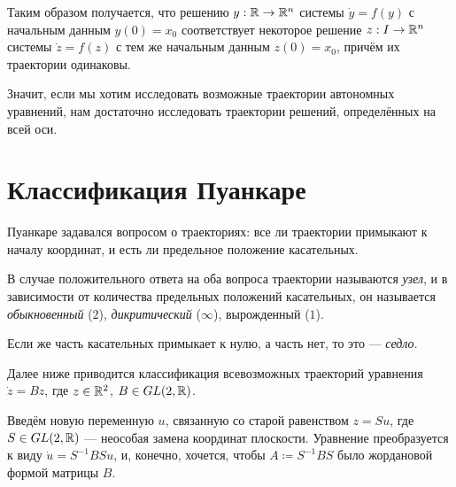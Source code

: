 \documentclass[a4paper]{report}
\begin{document}
    Таким образом получается, что решению $y: \mathbb{R} \rightarrow \mathbb{R}^n$ системы $\dot{y} = f(y)$ с начальным данным $y(0) = x_0$ соответствует некоторое решение $z: I \rightarrow \mathbb{R}^n$ системы $\dot{z} = f(z)$ с тем же начальным данным $z(0) = x_0$, причём их траектории одинаковы.

    Значит, если мы хотим исследовать возможные траектории автономных уравнений, нам достаточно исследовать траектории решений, определённых на всей оси.
    \section{Классификация Пуанкаре}
    Пуанкаре задавался вопросом о траекториях: все ли траектории примыкают к началу координат, и есть ли предельное положение касательных.

    В случае положительного ответа на оба вопроса траектории называются \emph{узел}, и в зависимости от количества предельных положений касательных, он называется \emph{обыкновенный} ($2$), \emph{дикритический} ($\infty$), вырожденный ($1$).

    Если же часть касательных примыкает к нулю, а часть нет, то это --- \emph{седло}.

    Далее ниже приводится классификация всевозможных траекторий уравнения $\dot{z} = Bz$, где $z \in \mathbb{R}^2$, $B \in GL(2, \mathbb{R})$.

    Введём новую переменную $u$, связанную со старой равенством $z = Su$, где $S \in GL(2, \mathbb{R})$ --- неособая замена координат плоскости.
    Уравнение преобразуется к виду $\dot{u} = S^{-1}BS u$, и, конечно, хочется, чтобы $A \coloneqq S^{-1}BS$ было жордановой формой матрицы $B$.
\end{document}
